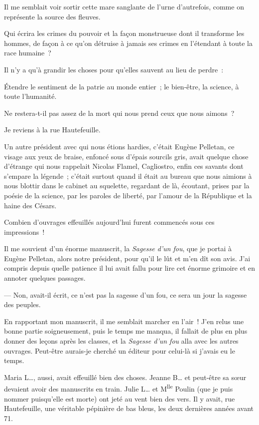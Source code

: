 \documentclass[french,twoside]{book} %
\begin{document}
Il me semblait voir sortir cette mare sanglante de l’urne d’autrefois, comme on représente la source des fleuves.\par
Qui écrira les crimes du pouvoir et la façon monstrueuse dont il transforme les hommes, de façon à ce qu’on détruise à jamais ses crimes en l’étendant à toute la race humaine ?\par
Il n’y a qu’à grandir les choses pour qu’elles sauvent au lieu de perdre :\par
Étendre le sentiment de la patrie au monde entier ; le bien-être, la science, à toute l’humanité.\par
Ne restera-t-il pas assez de la mort qui nous prend ceux que nous aimons ?\par
Je reviens à la rue Hautefeuille.\par
Un autre président avec qui nous étions hardies, c’était Eugène Pelletan, ce visage aux yeux de braise, enfoncé sous d’épais sourcils gris, avait quelque chose d’étrange qui nous rappelait Nicolas Flamel, Cagliostro, enfin ces savants dont s’empare la légende ; c’était surtout quand il était au bureau que nous aimions à nous blottir dans le cabinet au squelette, regardant de là, écoutant, prises par la poésie de la science, par les paroles de liberté, par  l’amour de la République et la haine des Césars.\par
Combien d’ouvrages effeuillés aujourd’hui furent commencés sous ces impressions !\par
Il me souvient d’un énorme manuscrit, la \emph{Sagesse d’un fou}, que je portai à Eugène Pelletan, alors notre président, pour qu’il le lût et m’en dît son avis. J’ai compris depuis quelle patience il lui avait fallu pour lire cet énorme grimoire et en annoter quelques passages.\par
— Non, avait-il écrit, ce n’est pas la sagesse d’un fou, ce sera un jour la sagesse des peuples.\par
En rapportant mon manuscrit, il me semblait marcher en l’air ! J’en relus une bonne partie soigneusement, puis le temps me manqua, il fallait de plus en plus donner des leçons après les classes, et la \emph{Sagesse d’un fou} alla avec les autres ouvrages. Peut-être aurais-je cherché un éditeur pour celui-là si j’avais eu le temps.\par
Maria L…, aussi, avait effeuillé bien des choses. Jeanne B… et peut-être sa sœur devaient avoir des manuscrits en train. Julie L… et M\textsuperscript{lle} Poulin (que je puis nommer puisqu’elle est morte) ont jeté au vent bien des vers. Il y avait, rue Hautefeuille, une véritable pépinière de bas bleus, les deux dernières années avant 71.\par
\end{document}
